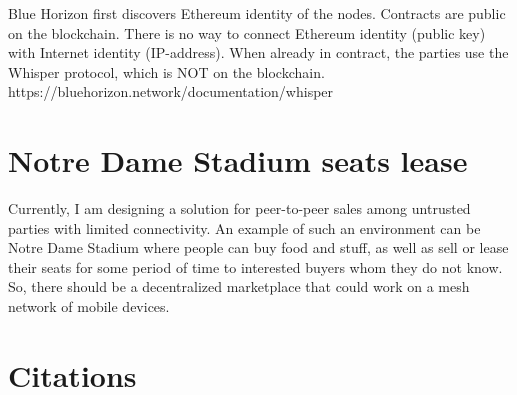 \documentclass{article}
\begin{document}
Blue Horizon first discovers Ethereum identity of the nodes. Contracts are public on the blockchain. There is no way to connect Ethereum identity (public key) with Internet identity (IP-address). When already in contract, the parties use the Whisper protocol, which is NOT on the blockchain. https://bluehorizon.network/documentation/whisper 

\section{Notre Dame Stadium seats lease}
Currently, I am designing a solution for peer-to-peer sales among untrusted parties with limited connectivity. An example of such an environment can be Notre Dame Stadium where people can buy food and stuff, as well as sell or lease their seats for some period of time to interested buyers whom they do not know. So, there should be a decentralized marketplace that could work on a mesh network of mobile devices.


\section{Citations}
\citep{adams1995hitchhiker}



\end{document}
